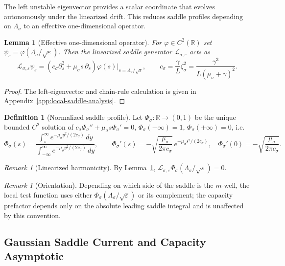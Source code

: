 \documentclass[11pt]{article}
\numberwithin{equation}{section}
\theoremstyle{plain}
\newtheorem{lemma}[theorem]{Lemma}
\theoremstyle{definition}
\newtheorem{definition}[theorem]{Definition}
\theoremstyle{remark}
\newtheorem{remark}[theorem]{Remark}
\newcommand{\R}{\mathbb R}
\newcommand{\eps}{\varepsilon}
\newcommand{\calL}{\mathcal L}
\begin{document}
The left unstable eigenvector provides a scalar coordinate that
evolves autonomously under the linearized drift.  This reduces saddle
profiles depending on $\Lambda_\sigma$ to an effective one-dimensional
operator.

\begin{lemma}[Effective one-dimensional operator]
\label{lem:local-profile-ode}
For $\varphi\in C^2(\R)$ set
$\psi_\eps=\varphi(\Lambda_\sigma/\sqrt\eps)$.  Then the linearized saddle
generator $\calL_{\sigma,\eps}$ acts as
\[
\calL_{\sigma,\eps}\psi_\eps
=
\left(c_\sigma\partial_s^2+\mu_\sigma s\,\partial_s\right)\varphi(s)\Big|_{s=\Lambda_\sigma/\sqrt\eps},
\qquad
c_\sigma=\frac{\gamma}{L}\zeta_\sigma^2=\frac{\gamma^3}{L(\mu_\sigma+\gamma)^2}.
\]
\end{lemma}

\begin{proof}
The left-eigenvector and chain-rule calculation is given in
Appendix~\ref{app:local-saddle-analysis}.
\end{proof}

\begin{definition}[Normalized saddle profile]
\label{def:normalized-saddle-profile}
Let $\Phi_\sigma:\R\to(0,1)$ be the unique bounded $C^2$ solution of
$c_\sigma\Phi_\sigma''+\mu_\sigma s\Phi_\sigma'=0$,
$\Phi_\sigma(-\infty)=1$, $\Phi_\sigma(+\infty)=0$, i.e.
\[
\Phi_\sigma(s)
=
\frac{\int_s^\infty e^{-\mu_\sigma y^2/(2c_\sigma)}\,dy}
{\int_{-\infty}^\infty e^{-\mu_\sigma y^2/(2c_\sigma)}\,dy},
\qquad
\Phi_\sigma'(s)=-\sqrt{\frac{\mu_\sigma}{2\pi c_\sigma}}\,e^{-\mu_\sigma s^2/(2c_\sigma)},
\quad
\Phi_\sigma'(0)=-\sqrt{\frac{\mu_\sigma}{2\pi c_\sigma}} .
\]
\end{definition}

\begin{remark}[Linearized harmonicity]
By Lemma~\ref{lem:local-profile-ode},
$\calL_{\sigma,\eps}\Phi_\sigma(\Lambda_\sigma/\sqrt\eps)=0$.
\end{remark}

\begin{remark}[Orientation]
Depending on which side of the saddle is the $m$-well, the local test function
uses either $\Phi_\sigma(\Lambda_\sigma/\sqrt\eps)$ or its complement; the
capacity prefactor depends only on the absolute leading saddle integral and is
unaffected by this convention.
\end{remark}

\subsection{Gaussian Saddle Current and Capacity Asymptotic}
\label{sec:gaussian-current}
\end{document}
